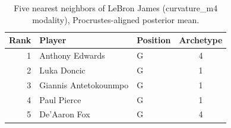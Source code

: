 \begin{table}[htbp]
  \centering\small
  \begin{tabular}{rllc}
    \toprule
    Rank & Player & Position & Archetype \\
    \midrule
    1 & Anthony Edwards & G & 4 \\
    2 & Luka Doncic & G & 1 \\
    3 & Giannis Antetokounmpo & G & 1 \\
    4 & Paul Pierce & G & 1 \\
    5 & De'Aaron Fox & G & 4 \\
    \bottomrule
  \end{tabular}
  \caption{Five nearest neighbors of LeBron James (curvature_m4 modality), Procrustes-aligned posterior mean.}
  \label{tab:LeBron_James_neighbors_curvature_m4}
\end{table}

